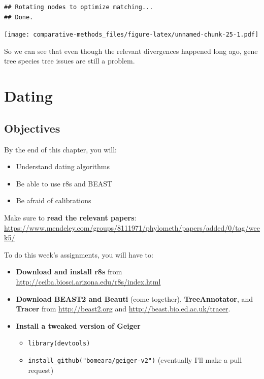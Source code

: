 \documentclass[]{article}
\providecommand{\tightlist}{%
  \setlength{\itemsep}{0pt}\setlength{\parskip}{0pt}}
\begin{document}
\begin{verbatim}
## Rotating nodes to optimize matching...
## Done.
\end{verbatim}

\texttt{[image: comparative-methods\_files/figure-latex/unnamed-chunk-25-1.pdf]}

So we can see that even though the relevant divergences happened long ago, gene tree species tree issues are still a problem.

\hypertarget{dating}{%
\section{Dating}\label{dating}}

\hypertarget{objectives-8}{%
\subsection{Objectives}\label{objectives-8}}

By the end of this chapter, you will:

\begin{itemize}
\tightlist
\item
  Understand dating algorithms
\item
  Be able to use r8s and BEAST
\item
  Be afraid of calibrations
\end{itemize}

Make sure to \textbf{read the relevant papers}: \url{https://www.mendeley.com/groups/8111971/phylometh/papers/added/0/tag/week5/}

To do this week's assignments, you will have to:

\begin{itemize}
\tightlist
\item
  \textbf{Download and install r8s} from \url{http://ceiba.biosci.arizona.edu/r8s/index.html}
\item
  \textbf{Download BEAST2 and Beauti} (come together), \textbf{TreeAnnotator}, and \textbf{Tracer} from \url{http://beast2.org} and \url{http://beast.bio.ed.ac.uk/tracer}.
\item
  \textbf{Install a tweaked version of Geiger}

  \begin{itemize}
  \tightlist
  \item
    \texttt{library(devtools)}
  \item
    \texttt{install\_github("bomeara/geiger-v2")} (eventually I'll make a pull request)
  \end{itemize}
\end{itemize}
\end{document}
